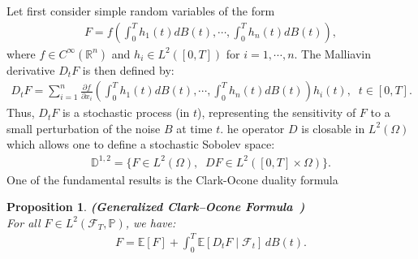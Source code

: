 \documentclass[12pt]{article}
\newtheorem{proposition}{Proposition}[section]
\theoremstyle{remark}
\numberwithin{equation}{section}
\def\D{\mathbb D}
\def\R{\mathbb R}
\begin{document}
Let first consider simple random variables of the form
\begin{eqnarray*}
	F=f\left(\int_0^Th_1(t)dB(t),\cdots,\int_0^T h_n(t)dB(t)\right),
\end{eqnarray*}
where $f\in C^{\infty}(\R^{n})$ and $h_i\in L^2([0,T])$ for $i=1,\cdots, n$. The Malliavin derivative $D_tF$ is then defined by:
\begin{eqnarray*}
	D_tF=\sum_{i=1}^{n}\frac{\partial f}{\partial x_i}\left(\int_0^T h_1(t)dB(t),\cdots,\int_0^T h_n(t)dB(t)\right)h_i(t),\;\; t\in [0,T].
\end{eqnarray*}
Thus, $D_tF$ is a stochastic process (in $t$), representing the sensitivity of $F$ to a small perturbation of the noise $B$ at time $t$. he operator $D$ is closable in $L^2(\Omega)$ which allows one to define a stochastic Sobolev space:
\begin{eqnarray*}
	\D^{1,2}=\{F\in L^{2}(\Omega),\;\; DF\in L^{2}([0,T]\times\Omega)\}. 
\end{eqnarray*}
One of the fundamental results is the Clark-Ocone duality formula
\begin{proposition}\label{GCO}
\textbf{(Generalized Clark--Ocone Formula~\cite{Aase2000})}\\
For all \( F \in L^2(\mathcal{F}_T, \mathbb{P}) \), we have:
\begin{eqnarray*}
F = \mathbb{E}[F] + \int_0^T \mathbb{E}[D_t F \mid \mathcal{F}_t] \, dB(t).
\end{eqnarray*}
\end{proposition}
\end{document}
